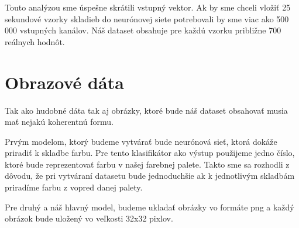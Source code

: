 Touto analýzou sme úspešne skrátili vstupný vektor.
Ak by sme chceli vložiť 25 sekundové vzorky skladieb do neurónovej siete potrebovali by sme viac ako 500 000 vstupných kanálov.
Náš dataset obsahuje pre každú vzorku približne 700 reálnych hodnôt.

\section{Obrazové dáta}
Tak ako hudobné dáta tak aj obrázky, ktoré bude náš dataset obsahovať musia mať nejakú koherentnú formu.

Prvým modelom, ktorý budeme vytvárať bude neurónová sieť, ktorá dokáže priradiť k skladbe farbu.
Pre tento klasifikátor ako výstup použijeme jedno číslo, ktoré bude reprezentovať farbu v našej farebnej palete.
Takto sme sa rozhodli z dôvodu, že pri vytváraní datasetu bude jednoduchšie ak k jednotlivým skladbám priradíme farbu z vopred danej palety.

Pre druhý a náš hlavný model, budeme ukladať obrázky vo formáte png a každý obrázok bude uložený vo veľkosti 32x32 pixlov.
